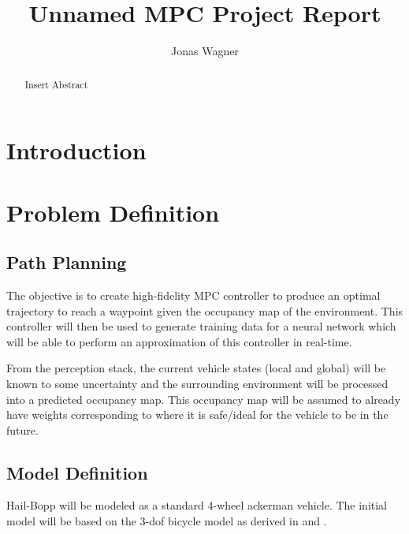 \documentclass[]{IEEEtran}
\title{
    Unnamed MPC Project Report
}
\author{Jonas Wagner} %
\begin{document}
\maketitle
\begin{abstract}
    Insert Abstract
\end{abstract}




\section{Introduction}



\section{Problem Definition}
\label{sec:pblm_def}



\subsection{Path Planning}
\label{subsec:pathPlanning}

The objective is to create high-fidelity MPC controller to produce an optimal trajectory to reach a waypoint given the occupancy map of the environment.
This controller will then be used to generate training data for a neural network which will be able to perform an approximation of this controller in real-time.

From the perception stack, the current vehicle states (local and global) will be known to some uncertainty and the surrounding environment will be processed into a predicted occupancy map.
This occupancy map will be assumed to already have weights corresponding to where it is safe/ideal for the vehicle to be in the future.





\subsection{Model Definition}
\label{subsec:mdl_def}
Hail-Bopp will be modeled as a standard 4-wheel ackerman vehicle.
The initial model will be based on the 3-dof bicycle model as derived in \cite{casanova_thesis} and \cite{vehcileDynamics_chapter2a}.
\end{document}
